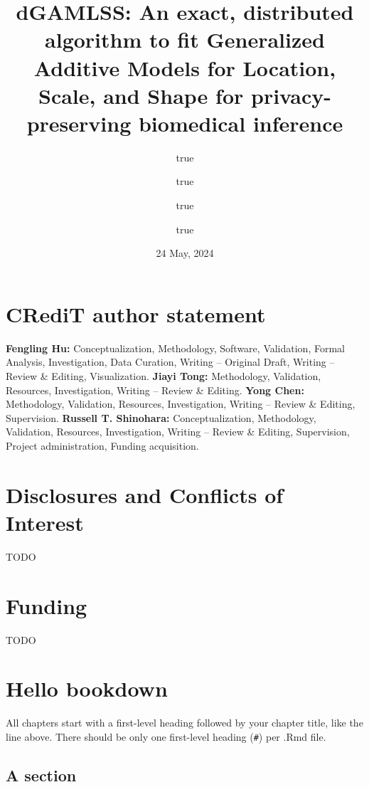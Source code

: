 \documentclass[
  12pt,
]{article}
\title{dGAMLSS: An exact, distributed algorithm to fit Generalized Additive Models for Location, Scale, and Shape for privacy-preserving biomedical inference}
\author{true \and true \and true \and true}
\date{24 May, 2024}
\begin{document}
\maketitle

\hypertarget{credit-author-statement}{%
\section*{CRediT author statement}\label{credit-author-statement}}

\textbf{Fengling Hu:} Conceptualization, Methodology, Software, Validation, Formal Analysis, Investigation, Data Curation, Writing -- Original Draft, Writing -- Review \& Editing, Visualization.
\textbf{Jiayi Tong:} Methodology, Validation, Resources, Investigation, Writing -- Review \& Editing.
\textbf{Yong Chen:} Methodology, Validation, Resources, Investigation, Writing -- Review \& Editing, Supervision.
\textbf{Russell T. Shinohara:} Conceptualization, Methodology, Validation, Resources, Investigation, Writing -- Review \& Editing, Supervision, Project administration, Funding acquisition.

\hypertarget{disclosures-and-conflicts-of-interest}{%
\section*{Disclosures and Conflicts of Interest}\label{disclosures-and-conflicts-of-interest}}

TODO

\hypertarget{funding}{%
\section*{Funding}\label{funding}}

TODO

\newpage

\hypertarget{hello-bookdown}{%
\section{Hello bookdown}\label{hello-bookdown}}

All chapters start with a first-level heading followed by your chapter title, like the line above. There should be only one first-level heading (\texttt{\#}) per .Rmd file.

\hypertarget{a-section}{%
\subsection{A section}\label{a-section}}
\end{document}
